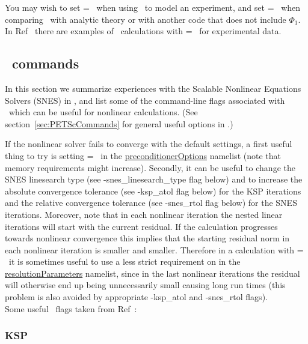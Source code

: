 You may wish to set  = \true~when
using \sfincs~to model an experiment, and set  = \false~when
comparing \sfincs~with analytic theory or with another code that does not include $\Phi_1$. 
In Ref~\cite{Mollen2018} there are examples of \sfincs~calculations with  = \true~for experimental data.

\subsection{\PETSc~commands}
In this section we summarize experiences with the Scalable Nonlinear Equations Solvers (SNES) in \PETSc, 
and list some of the command-line flags associated with \PETSc~which can be useful for nonlinear calculations. 
(See section~\ref{sec:PETScCommands} for general useful options in \sfincs.) 

If the nonlinear solver fails to converge with the default settings, a first useful thing to try is setting  = \false~in the {\ttfamily \hyperref[sec:preconditionerOptions]{preconditionerOptions}} namelist (note that memory requirements might increase). 
Secondly, it can be useful to change the SNES linesearch type (see -snes\_linesearch\_type flag below) and to increase the absolute convergence tolerance (see -ksp\_atol flag below) for the KSP iterations and the relative convergence tolerance (see -snes\_rtol flag below) for the SNES iterations. 
Moreover, note that in each nonlinear iteration the nested linear iterations will start with the current residual. If the calculation progresses towards nonlinear convergence this implies that the starting residual norm in each nonlinear iteration is smaller and smaller. Therefore in a calculation with  = \true~it is sometimes useful to use a less strict requirement on  in the {\ttfamily \hyperref[sec:resolutionParameters]{resolutionParameters}} namelist, since in the last nonlinear iterations the residual will otherwise end up being unnecessarily small causing long run times (this problem is also avoided by appropriate -ksp\_atol and -snes\_rtol flags).\\ 
Some useful \PETSc~flags taken from Ref~\cite{PETSc2017}:\\

\subsubsection{KSP}

